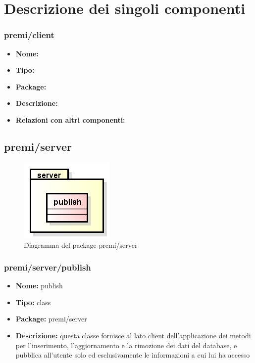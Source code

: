 \section{Descrizione dei singoli componenti}
\subsubsection{premi/client}
\begin{itemize}
  \item[] \textbf{Nome:}
  \item[] \textbf{Tipo:}
  \item[] \textbf{Package:} 
  \item[] \textbf{Descrizione:} 
  \item[] \textbf{Relazioni con altri componenti:} 
\end{itemize}


\subsection{premi/server}
\begin{figure}[h]
\begin{center}
\includegraphics[scale=0.45]{img/diapkg/server.png}
\caption{Diagramma del package premi/server}
\end{center}
\end{figure}

\subsubsection{premi/server/publish}
\begin{itemize}
  \item[] \textbf{Nome:} publish
  \item[] \textbf{Tipo:} class
  \item[] \textbf{Package:} premi/server
  \item[] \textbf{Descrizione:} questa classe fornisce al lato client dell'applicazione dei metodi per l'inserimento, l'aggiornamento e la rimozione dei dati del database, e pubblica all'utente solo ed esclusivamente le informazioni a cui lui ha accesso
\end{itemize}






